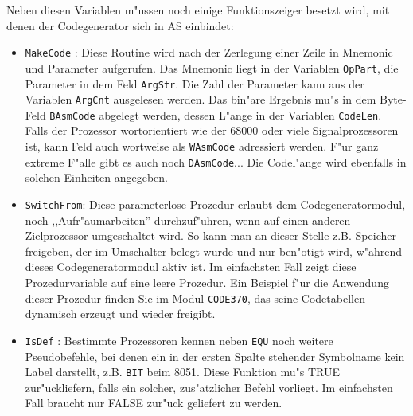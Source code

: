 \documentclass[12pt,a4paper,twoside]{report}
\newcommand{\tty}[1]{{\tt #1}}
\begin{document}
Neben diesen Variablen m"ussen noch einige Funktionszeiger besetzt wird,
mit denen der Codegenerator sich in AS einbindet:
\begin{itemize}
\item{\tty{MakeCode} : Diese Routine wird nach der Zerlegung einer Zeile
      in Mnemonic und Parameter aufgerufen.  Das Mnemonic liegt in der
      Variablen \tty{OpPart}, die Parameter in dem Feld \tty{ArgStr}.
      Die Zahl der Parameter kann aus der Variablen \tty{ArgCnt} ausgelesen
      werden.  Das bin"are Ergebnis mu"s in dem Byte-Feld \tty{BAsmCode}
      abgelegt werden, dessen L"ange in der Variablen \tty{CodeLen}.  Falls
      der Prozessor wortorientiert wie der 68000 oder viele Signalprozessoren
      ist, kann Feld auch wortweise als \tty{WAsmCode} adressiert werden.
      F"ur ganz extreme F"alle gibt es auch noch \tty{DAsmCode}... Die
      Codel"ange wird ebenfalls in solchen Einheiten angegeben.}
\item{\tty{SwitchFrom}: Diese parameterlose Prozedur erlaubt dem
      Codegeneratormodul, noch ,,Aufr"aumarbeiten'' durchzuf"uhren,
      wenn auf einen anderen Zielprozessor umgeschaltet wird.  So
      kann man an dieser Stelle z.B. Speicher freigeben, der im
      Umschalter belegt wurde und nur ben"otigt wird, w"ahrend dieses
      Codegeneratormodul aktiv ist.  Im einfachsten Fall zeigt diese
      Prozedurvariable auf eine leere Prozedur.  Ein Beispiel f"ur die
      Anwendung dieser Prozedur finden Sie im Modul \tty{CODE370}, das
      seine Codetabellen dynamisch erzeugt und wieder freigibt.}
\item{\tty{IsDef} : Bestimmte Prozessoren kennen neben \tty{EQU} noch weitere
      Pseudobefehle, bei denen ein in der ersten Spalte stehender
      Symbolname kein Label darstellt, z.B. \tty{BIT} beim 8051.  Diese
      Funktion mu"s TRUE zur"uckliefern, falls ein solcher, zus"atzlicher
      Befehl vorliegt.  Im einfachsten Fall braucht nur FALSE
      zur"uck geliefert zu werden.}
\end{itemize}
\end{document}
